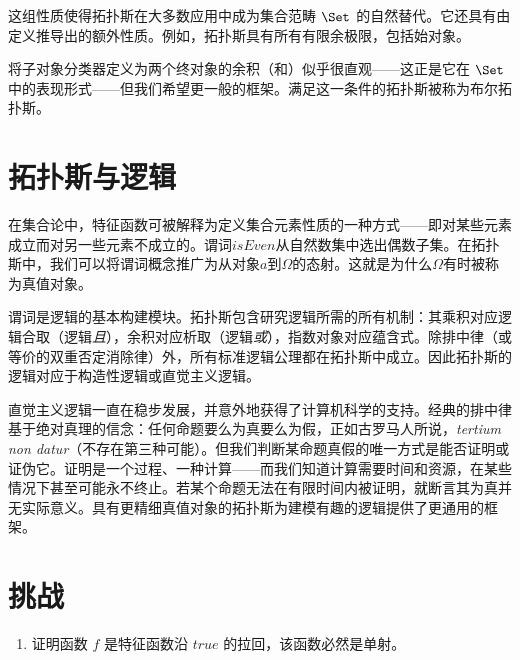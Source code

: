 这组性质使得拓扑斯在大多数应用中成为集合范畴 $\Set$ 的自然替代。它还具有由定义推导出的额外性质。例如，拓扑斯具有所有有限余极限，包括始对象。

将子对象分类器定义为两个终对象的余积（和）似乎很直观——这正是它在 $\Set$ 中的表现形式——但我们希望更一般的框架。满足这一条件的拓扑斯被称为布尔拓扑斯。

\section{拓扑斯与逻辑}

在集合论中，特征函数可被解释为定义集合元素性质的一种方式——即对某些元素成立而对另一些元素不成立的。谓词$\mathit{isEven}$从自然数集中选出偶数子集。在拓扑斯中，我们可以将谓词概念推广为从对象$a$到$\Omega$的态射。这就是为什么$\Omega$有时被称为真值对象。

谓词是逻辑的基本构建模块。拓扑斯包含研究逻辑所需的所有机制：其乘积对应逻辑合取（逻辑\emph{且}），余积对应析取（逻辑\emph{或}），指数对象对应蕴含式。除排中律（或等价的双重否定消除律）外，所有标准逻辑公理都在拓扑斯中成立。因此拓扑斯的逻辑对应于构造性逻辑或直觉主义逻辑。

直觉主义逻辑一直在稳步发展，并意外地获得了计算机科学的支持。经典的排中律基于绝对真理的信念：任何命题要么为真要么为假，正如古罗马人所说，\emph{tertium non datur}（不存在第三种可能）。但我们判断某命题真假的唯一方式是能否证明或证伪它。证明是一个过程、一种计算——而我们知道计算需要时间和资源，在某些情况下甚至可能永不终止。若某个命题无法在有限时间内被证明，就断言其为真并无实际意义。具有更精细真值对象的拓扑斯为建模有趣的逻辑提供了更通用的框架。

\section{挑战}

\begin{enumerate}
  \tightlist
  \item
        证明函数 $f$ 是特征函数沿 $\mathit{true}$ 的拉回，该函数必然是单射。
\end{enumerate}